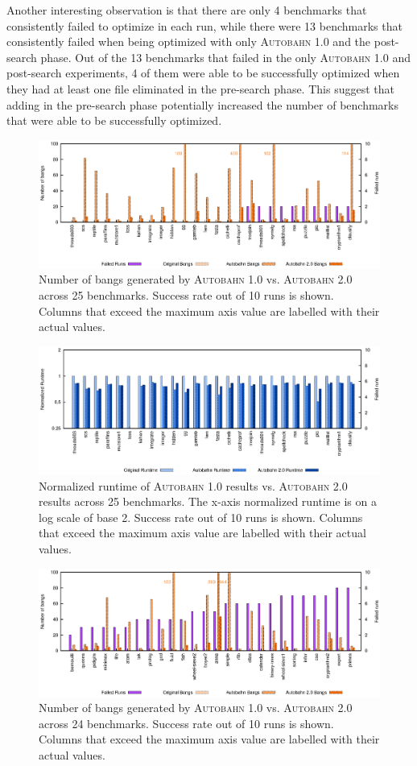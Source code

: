 \documentclass[format=sigplan, review=true]{acmart}
\newcommand{\Ao}[0]{\textsc{Autobahn 1.0}}
\newcommand{\At}[0]{\textsc{Autobahn 2.0}}
\newcommand{\preopt}[0]{pre-search}
\newcommand{\postopt}[0]{post-search}
\begin{document}
Another interesting observation is that there are only 4 benchmarks that consistently failed to optimize in each run, while there were 13 benchmarks that consistently failed when being optimized with only \Ao{} and the \postopt{} phase. Out of the 13 benchmarks that failed in the only \Ao{} and \postopt{} experiments, 4 of them were able to be successfully optimized when they had at least one file eliminated in the \preopt{} phase. This suggest that adding in the \preopt{} phase potentially increased the number of benchmarks that were able to be successfully optimized.

\begin{figure}
\includegraphics[width=\textwidth]{pap0-bangs}
\caption{Number of bangs generated by \Ao{} vs. \At{} across 25 benchmarks. Success rate out of 10 runs is shown. Columns that exceed the maximum axis value are labelled with their actual values.}
\end{figure}

\begin{figure}
\includegraphics[width=\textwidth]{pap0}
\caption{Normalized runtime of \Ao{} results vs. \At{} results across 25 benchmarks. The x-axis normalized runtime is on a log scale of base 2. Success rate out of 10 runs is shown. Columns that exceed the maximum axis value are labelled with their actual values.}
\end{figure}

\begin{figure}
\includegraphics[width=\textwidth]{pap1-bangs}
\caption{Number of bangs generated by \Ao{} vs. \At{} across 24 benchmarks. Success rate out of 10 runs is shown. Columns that exceed the maximum axis value are labelled with their actual values.}
\end{figure}
\end{document}
